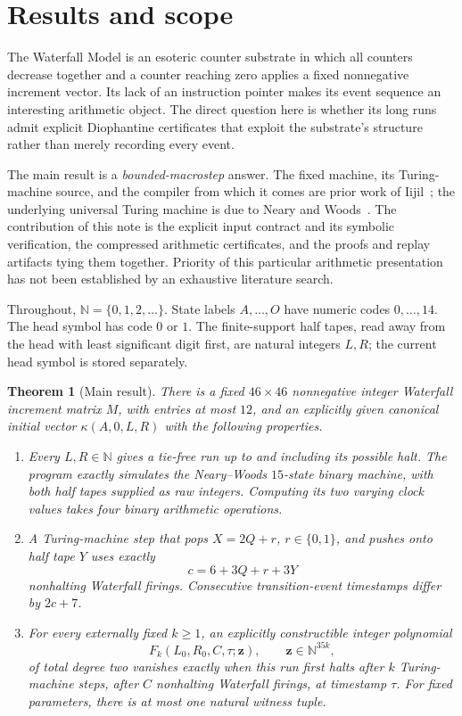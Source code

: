\documentclass[11pt,letterpaper]{article}
\newtheorem{theorem}{Theorem}[section]
\theoremstyle{definition}
\theoremstyle{remark}
\newcommand{\N}{\mathbb N}
\newcommand{\cani}{\kappa}
\begin{document}
\section{Results and scope}\label{qoc:wf:sec:results}
The Waterfall Model is an esoteric counter substrate in which all counters decrease together and a counter reaching zero applies a fixed nonnegative increment vector. Its lack of an instruction pointer makes its event sequence an interesting arithmetic object. The direct question here is whether its long runs admit explicit Diophantine certificates that exploit the substrate's structure rather than merely recording every event.

The main result is a \emph{bounded-macrostep} answer. The fixed machine, its Turing-machine source, and the compiler from which it comes are prior work of Iijil~\cite{wf:iijil-matrix,wf:iijil-tm,wf:iijil-compiler}; the underlying universal Turing machine is due to Neary and Woods~\cite{wf:nw}. The contribution of this note is the explicit input contract and its symbolic verification, the compressed arithmetic certificates, and the proofs and replay artifacts tying them together. Priority of this particular arithmetic presentation has not been established by an exhaustive literature search.

Throughout, $\N=\{0,1,2,\ldots\}$. State labels $A,\ldots,O$ have numeric codes $0,\ldots,14$. The head symbol has code $0$ or $1$. The finite-support half tapes, read away from the head with least significant digit first, are natural integers $L,R$; the current head symbol is stored separately.

\begin{theorem}[Main result]\label{qoc:wf:thm:main}
There is a fixed $46\times46$ nonnegative integer Waterfall increment matrix $M$, with entries at most $12$, and an explicitly given canonical initial vector $\cani(A,0,L,R)$ with the following properties.
\begin{enumerate}[label=(\roman*)]
\item Every $L,R\in\N$ gives a tie-free run up to and including its possible halt. The program exactly simulates the Neary--Woods $15$-state binary machine, with both half tapes supplied as raw integers. Computing its two varying clock values takes four binary arithmetic operations.
\item A Turing-machine step that pops $X=2Q+r$, $r\in\{0,1\}$, and pushes onto half tape $Y$ uses exactly
\[
 c=6+3Q+r+3Y
\]
nonhalting Waterfall firings. Consecutive transition-event timestamps differ by $2c+7$.
\item For every externally fixed $k\ge1$, an explicitly constructible integer polynomial
\[
 F_k(L_0,R_0,C,\tau;\mathbf z),\qquad \mathbf z\in\N^{35k},
\]
of total degree two vanishes exactly when this run first halts after $k$ Turing-machine steps, after $C$ nonhalting Waterfall firings, at timestamp $\tau$. For fixed parameters, there is at most one natural witness tuple.
\end{enumerate}
\end{theorem}
\end{document}
